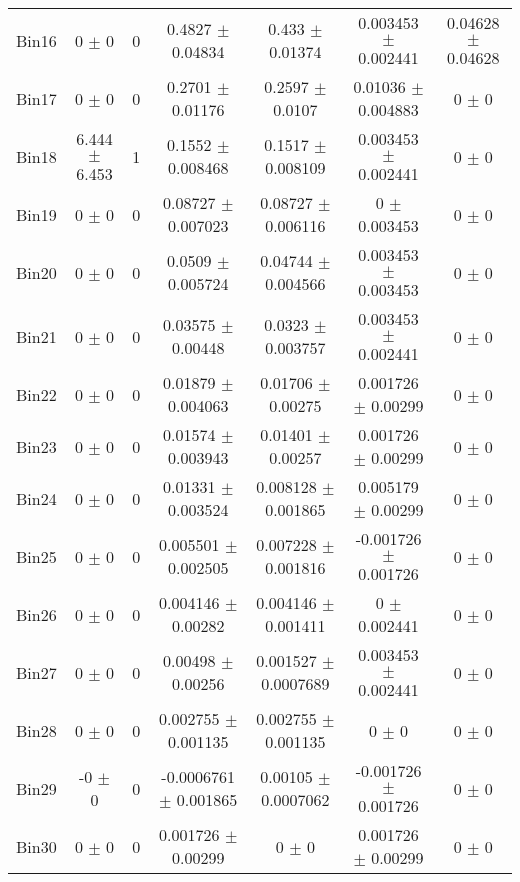 \begin{tabular}{@{\extracolsep{4pt}}lcccccc@{}}
     Bin16 & 0 $\pm$ 0 & 0 & 0.4827 $\pm$ 0.04834 & 0.433 $\pm$ 0.01374 & 0.003453 $\pm$ 0.002441 & 0.04628 $\pm$ 0.04628 \\ 
     Bin17 & 0 $\pm$ 0 & 0 & 0.2701 $\pm$ 0.01176 & 0.2597 $\pm$ 0.0107 & 0.01036 $\pm$ 0.004883 & 0 $\pm$ 0 \\ 
     Bin18 & 6.444 $\pm$ 6.453 & 1 & 0.1552 $\pm$ 0.008468 & 0.1517 $\pm$ 0.008109 & 0.003453 $\pm$ 0.002441 & 0 $\pm$ 0 \\ 
     Bin19 & 0 $\pm$ 0 & 0 & 0.08727 $\pm$ 0.007023 & 0.08727 $\pm$ 0.006116 & 0 $\pm$ 0.003453 & 0 $\pm$ 0 \\ 
     Bin20 & 0 $\pm$ 0 & 0 & 0.0509 $\pm$ 0.005724 & 0.04744 $\pm$ 0.004566 & 0.003453 $\pm$ 0.003453 & 0 $\pm$ 0 \\ 
     Bin21 & 0 $\pm$ 0 & 0 & 0.03575 $\pm$ 0.00448 & 0.0323 $\pm$ 0.003757 & 0.003453 $\pm$ 0.002441 & 0 $\pm$ 0 \\ 
     Bin22 & 0 $\pm$ 0 & 0 & 0.01879 $\pm$ 0.004063 & 0.01706 $\pm$ 0.00275 & 0.001726 $\pm$ 0.00299 & 0 $\pm$ 0 \\ 
     Bin23 & 0 $\pm$ 0 & 0 & 0.01574 $\pm$ 0.003943 & 0.01401 $\pm$ 0.00257 & 0.001726 $\pm$ 0.00299 & 0 $\pm$ 0 \\ 
     Bin24 & 0 $\pm$ 0 & 0 & 0.01331 $\pm$ 0.003524 & 0.008128 $\pm$ 0.001865 & 0.005179 $\pm$ 0.00299 & 0 $\pm$ 0 \\ 
     Bin25 & 0 $\pm$ 0 & 0 & 0.005501 $\pm$ 0.002505 & 0.007228 $\pm$ 0.001816 & -0.001726 $\pm$ 0.001726 & 0 $\pm$ 0 \\ 
     Bin26 & 0 $\pm$ 0 & 0 & 0.004146 $\pm$ 0.00282 & 0.004146 $\pm$ 0.001411 & 0 $\pm$ 0.002441 & 0 $\pm$ 0 \\ 
     Bin27 & 0 $\pm$ 0 & 0 & 0.00498 $\pm$ 0.00256 & 0.001527 $\pm$ 0.0007689 & 0.003453 $\pm$ 0.002441 & 0 $\pm$ 0 \\ 
     Bin28 & 0 $\pm$ 0 & 0 & 0.002755 $\pm$ 0.001135 & 0.002755 $\pm$ 0.001135 & 0 $\pm$ 0 & 0 $\pm$ 0 \\ 
     Bin29 & -0 $\pm$ 0 & 0 & -0.0006761 $\pm$ 0.001865 & 0.00105 $\pm$ 0.0007062 & -0.001726 $\pm$ 0.001726 & 0 $\pm$ 0 \\ 
     Bin30 & 0 $\pm$ 0 & 0 & 0.001726 $\pm$ 0.00299 & 0 $\pm$ 0 & 0.001726 $\pm$ 0.00299 & 0 $\pm$ 0 \\ 
\hline\hline
  \end{tabular}
